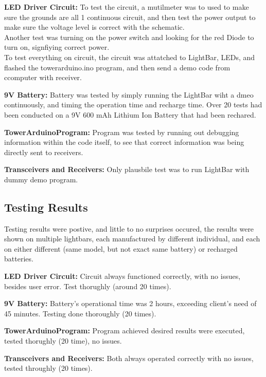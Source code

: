 \documentclass[12pt]{article}
\begin{document}
{{{{			\noindent \textbf{LED Driver Circuit:} To test the circuit, a mutilmeter was to used to make sure the grounds are all 1 continuous circuit, and then test the power output to make sure the voltage level is correct with the schematic.\\
			Another test was turning on the power switch and looking for the red Diode to turn on, signfiying correct power.\\
			To test everything on circuit, the circuit was attatched to LightBar, LEDs, and flashed the towerarduino.ino program, and then send a demo code from ccomputer with receiver.
			
			\noindent \textbf{9V Battery:} Battery was tested by simply running the LightBar wiht a dmeo continuously, and timing the operation time and recharge time. Over 20 tests had been conducted on a 9V 600 mAh Lithium Ion Battery that had been rechared.
			
			\noindent \textbf{TowerArduinoProgram:} Program was tested by running out debugging information within the code itself, to see that correct information was being directly sent to receivers.
			
			\noindent \textbf{Transceivers and Receivers:} Only plausbile test was to run LightBar with dummy demo program.
	
		\subsection{Testing Results}
		Testing results were postive, and little to no surprises occured, the results were shown on multiple lightbars, each manufactured by different individual, and each on either different (same model, but not exact same battery) or recharged batteries.
		
				\noindent \textbf{LED Driver Circuit:} Circuit always functioned correctly, with no issues, besides user error. Test thorughly (around 20 times).
				
				\noindent \textbf{9V Battery:} Battery's operational time was 2 hours, exceeding client's need of 45 minutes. Testing done thoroughly (20 times).
				
				\noindent \textbf{TowerArduinoProgram:} Program achieved desired results were executed, tested thorughly (20 time), no issues.
				
				\noindent \textbf{Transceivers and Receivers:} Both always operated correctly with no issues, tested throughly (20 times). 
				
				\newpage
	
}}}}
\end{document}
